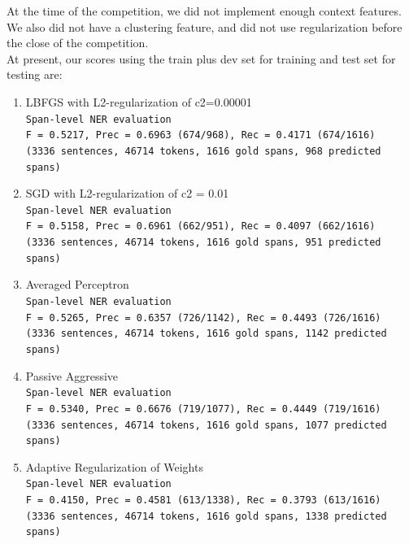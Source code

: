 \documentclass[a4paper]{article}
\begin{document}
At the time of the competition, we did not implement enough context features. We also did not have a clustering feature, and did not use regularization before the close of the competition. \\

At present, our scores using the train plus dev set for training and test set for testing are: \\

\begin{enumerate}

\item LBFGS with L2-regularization of c2=0.00001 \\
\texttt{Span-level NER evaluation}\\
\texttt{F = 0.5217,  Prec = 0.6963 (674/968),  Rec = 0.4171 (674/1616)}\\
\texttt{(3336 sentences, 46714 tokens, 1616 gold spans, 968 predicted spans)}\\

\item SGD with L2-regularization of c2 = 0.01 \\
\texttt{Span-level NER evaluation}\\
\texttt{F = 0.5158,  Prec = 0.6961 (662/951),  Rec = 0.4097 (662/1616)}\\
\texttt{(3336 sentences, 46714 tokens, 1616 gold spans, 951 predicted spans)}\\

\item Averaged Perceptron \\
\texttt{Span-level NER evaluation}\\
\texttt{F = 0.5265,  Prec = 0.6357 (726/1142),  Rec = 0.4493 (726/1616)}\\
\texttt{(3336 sentences, 46714 tokens, 1616 gold spans, 1142 predicted spans)}\\

\item Passive Aggressive \\
\texttt{Span-level NER evaluation}\\
\texttt{F = 0.5340,  Prec = 0.6676 (719/1077),  Rec = 0.4449 (719/1616)}\\
\texttt{(3336 sentences, 46714 tokens, 1616 gold spans, 1077 predicted spans)}\\

\item Adaptive Regularization of Weights \\
\texttt{Span-level NER evaluation}\\
\texttt{F = 0.4150,  Prec = 0.4581 (613/1338),  Rec = 0.3793 (613/1616)}\\
\texttt{(3336 sentences, 46714 tokens, 1616 gold spans, 1338 predicted spans)}\\

\end{enumerate}
\end{document}
